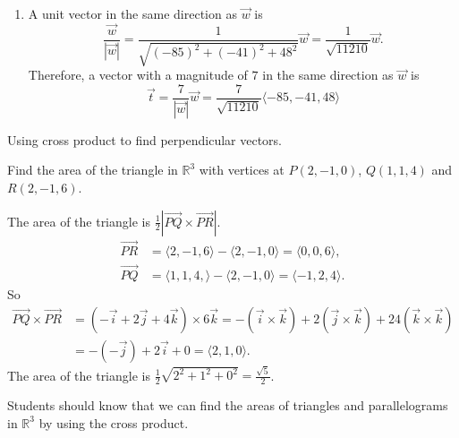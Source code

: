 \documentclass[handout]{ximera}
\begin{document}
\begin{problem}
\begin{freeResponse}
\begin{enumerate}
	\item	
	A unit vector in the same direction as $\vec{w}$ is
		\[
		\frac{\vec{w}}{| \vec{w} |}
		= \frac{1}{\sqrt{(-85)^2 + (-41)^2 + 48^2}} \vec{w} = \frac{1}{\sqrt{11210}} \vec{w}.
		\]
	Therefore, a vector with a magnitude of $7$ in the same direction as $\vec{w}$ is
		\[
		\vec{t} = \frac{7}{| \vec{w} |} \vec{w} = \boxed{\frac{7}{\sqrt{11210}} \langle -85,-41,48 \rangle}
		\]
		
		\end{enumerate}
		
	\end{freeResponse}
		
\end{problem}

\begin{instructorNotes}
Using cross product to find perpendicular vectors. 
\end{instructorNotes}




\begin{problem}
Find the area of the triangle in $\mathbb{R}^3$ with vertices at $P(2, -1, 0)$, $Q(1, 1, 4)$ and $R(2, -1, 6)$. 
	\begin{freeResponse}
	The area of the triangle is $\frac{1}{2} | \vec{PQ} \times \vec{PR}|$. 
	\begin{align*}
	\vec{PR} &= \langle 2, -1, 6 \rangle - \langle 2, -1, 0 \rangle = \langle 0, 0, 6 \rangle, \\
	\vec{PQ} &= \langle 1, 1, 4, \rangle - \langle 2, -1, 0 \rangle = \langle -1, 2, 4 \rangle.
	\end{align*}
	So 
	\begin{align*}
	\vec{PQ} \times \vec{PR} &= (-\vec{i} +2\vec{j} +4\vec{k})\times 6\vec{k} = - (\vec{i}\times \vec{k}) +2 (\vec{j} \times \vec{k}) +24 (\vec{k}\times \vec{k}) \\ &= - (-\vec{j}) + 2 \vec{i} + 0 = \langle 2, 1, 0 \rangle.
	\end{align*}
	The area of the triangle is $\frac{1}{2} \sqrt{2^2+1^2+0^2} = \frac{\sqrt{5}}{2}$. 
	\end{freeResponse}
		
\end{problem}

\begin{instructorNotes}
Students should know that we can find the areas of triangles and parallelograms in $\mathbb{R}^3$ by using the cross product.
\end{instructorNotes}
\end{document}
